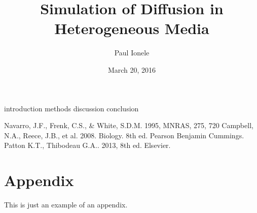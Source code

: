 \documentclass{jthesis}
\title{Simulation of Diffusion in Heterogeneous Media}
\date{March 20, 2016}
\author{Paul Ionele}
\begin{document}
\maketitle



\makedeclaration

\maketableofcontents

\doublespacing

{introduction}
\newpage
{methods}
\newpage
{discussion}
\newpage
{conclusion}

\begin{thebibliography}{}

 Navarro, J.F., Frenk, C.S., \& White, S.D.M.  1995, MNRAS, 275, 720
 Campbell, N.A., Reece, J.B., et al. 2008. Biology. 8th ed. Pearson Benjamin Cummings.
 Patton K.T., Thibodeau G.A.. 2013, 8th ed. Elsevier.


\end{thebibliography}

\appendix

\chapter{Appendix}
\label{app:sample}
This is just an example of an appendix.
\end{document}
